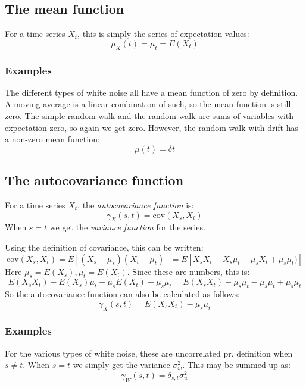 \documentclass[12pt, a4paper]{article}
\numberwithin{equation}{section}
\begin{document}
\subsection{The mean function}
For a time series $X_t$, this is simply the series of expectation values:
\begin{equation}
\mu_X(t)=\mu_t=E(X_t)
\end{equation}

\subsubsection{Examples}
The different types of white noise all have a mean function of zero by definition. A moving average is a linear combination of such, so the mean function is still zero. The simple random walk and the random walk are sums of variables with expectation zero, so again we get zero. However, the random walk with drift has a non-zero mean function:
\begin{equation}
\mu(t)=\delta t
\end{equation}

\subsection{The autocovariance function}
For a time series $X_t$, the \textit{autocovariance function} is:
\begin{equation}
\gamma_X(s,t)=\textrm{cov}(X_s,X_t)
\end{equation}
When $s=t$ we get the \textit{variance function} for the series.

Using the definition of covariance, this can be written:
\begin{equation}
\textrm{cov}(X_s,X_t)=E[(X_s-\mu_s)(X_t-\mu_t)]=E[X_s X_t-X_s\mu_t-\mu_s X_t+\mu_s\mu_t)]
\end{equation}
Here $\mu_s=E(X_s), \mu_t=E(X_t)$. Since these are numbers, this is:
\begin{equation}
E(X_s X_t)-E(X_s)\mu_t-\mu_s E(X_t)+\mu_s\mu_t=E(X_s X_t)-\mu_s\mu_t-\mu_s\mu_t+\mu_s\mu_t
\end{equation}
So the autocovariance function can also be calculated as follows:
\begin{equation}
\gamma_X(s,t)=E(X_s X_t)-\mu_s\mu_t
\end{equation}

\subsubsection{Examples}
For the various types of white noise, these are uncorrelated pr. definition when $s\neq t$. When $s=t$ we simply get the variance $\sigma_w^2$. This may be summed up as:
\begin{equation}
\gamma_W(s,t)=\delta_{s,t}\sigma_w^2
\end{equation}
\end{document}
